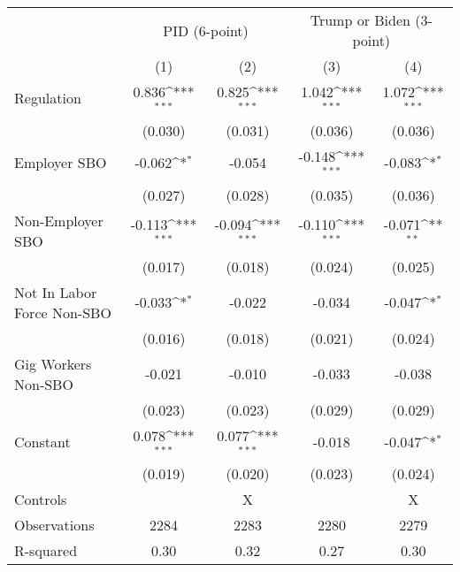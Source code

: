 {
\def\sym#1{\ifmmode^{#1}\else\(^{#1}\)\fi}
\begin{tabular}{l*{4}{c}}
\hline\hline
                    &\multicolumn{2}{c}{PID (6-point)}          &\multicolumn{2}{c}{Trump or Biden (3-point)}\\
                    &\multicolumn{1}{c}{(1)}         &\multicolumn{1}{c}{(2)}         &\multicolumn{1}{c}{(3)}         &\multicolumn{1}{c}{(4)}         \\
\hline
Regulation          &       0.836\sym{***}&       0.825\sym{***}&       1.042\sym{***}&       1.072\sym{***}\\
                    &     (0.030)         &     (0.031)         &     (0.036)         &     (0.036)         \\
Employer SBO        &      -0.062\sym{*}  &      -0.054         &      -0.148\sym{***}&      -0.083\sym{*}  \\
                    &     (0.027)         &     (0.028)         &     (0.035)         &     (0.036)         \\
Non-Employer SBO    &      -0.113\sym{***}&      -0.094\sym{***}&      -0.110\sym{***}&      -0.071\sym{**} \\
                    &     (0.017)         &     (0.018)         &     (0.024)         &     (0.025)         \\
Not In Labor Force Non-SBO&      -0.033\sym{*}  &      -0.022         &      -0.034         &      -0.047\sym{*}  \\
                    &     (0.016)         &     (0.018)         &     (0.021)         &     (0.024)         \\
Gig Workers Non-SBO &      -0.021         &      -0.010         &      -0.033         &      -0.038         \\
                    &     (0.023)         &     (0.023)         &     (0.029)         &     (0.029)         \\
Constant            &       0.078\sym{***}&       0.077\sym{***}&      -0.018         &      -0.047\sym{*}  \\
                    &     (0.019)         &     (0.020)         &     (0.023)         &     (0.024)         \\
\hline
Controls            &                     &           X         &                     &           X         \\
Observations        &        2284         &        2283         &        2280         &        2279         \\
R-squared           &        0.30         &        0.32         &        0.27         &        0.30         \\
\hline\hline
\end{tabular}
}
